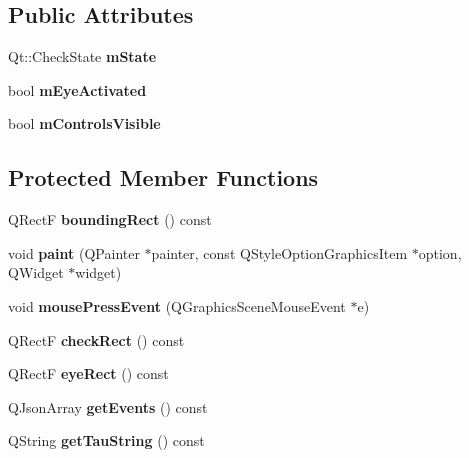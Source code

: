 \subsection*{Public Attributes}
\begin{DoxyCompactItemize}
\item 
\hypertarget{class_phase_item_aa2effba18be1471083090d427da22d91}{Qt\-::\-Check\-State {\bfseries m\-State}}\label{class_phase_item_aa2effba18be1471083090d427da22d91}

\item 
\hypertarget{class_phase_item_adb1a1b264fc34d4a6c4dd3b1ed515132}{bool {\bfseries m\-Eye\-Activated}}\label{class_phase_item_adb1a1b264fc34d4a6c4dd3b1ed515132}

\item 
\hypertarget{class_phase_item_a510033145589f21d329b06dfcb3239d1}{bool {\bfseries m\-Controls\-Visible}}\label{class_phase_item_a510033145589f21d329b06dfcb3239d1}

\end{DoxyCompactItemize}
\subsection*{Protected Member Functions}
\begin{DoxyCompactItemize}
\item 
\hypertarget{class_phase_item_a6be04060907ace485b996a20e0458852}{Q\-Rect\-F {\bfseries bounding\-Rect} () const }\label{class_phase_item_a6be04060907ace485b996a20e0458852}

\item 
\hypertarget{class_phase_item_aa6dd3c7b718102d6e7c5d00ca1f2c5d5}{void {\bfseries paint} (Q\-Painter $\ast$painter, const Q\-Style\-Option\-Graphics\-Item $\ast$option, Q\-Widget $\ast$widget)}\label{class_phase_item_aa6dd3c7b718102d6e7c5d00ca1f2c5d5}

\item 
\hypertarget{class_phase_item_a365277cb2b6a40f8b7928072f4418f83}{void {\bfseries mouse\-Press\-Event} (Q\-Graphics\-Scene\-Mouse\-Event $\ast$e)}\label{class_phase_item_a365277cb2b6a40f8b7928072f4418f83}

\item 
\hypertarget{class_phase_item_a31c4321ce236e2f5c6e9622c368e03be}{Q\-Rect\-F {\bfseries check\-Rect} () const }\label{class_phase_item_a31c4321ce236e2f5c6e9622c368e03be}

\item 
\hypertarget{class_phase_item_a7fd7e64f2ede28dad4130e0c7e5c0acd}{Q\-Rect\-F {\bfseries eye\-Rect} () const }\label{class_phase_item_a7fd7e64f2ede28dad4130e0c7e5c0acd}

\item 
\hypertarget{class_phase_item_af8ff8ef35e6a449c1c17a303a80ba0d1}{Q\-Json\-Array {\bfseries get\-Events} () const }\label{class_phase_item_af8ff8ef35e6a449c1c17a303a80ba0d1}

\item 
\hypertarget{class_phase_item_af5dcdd77bd9d0dbebb76c5098c0b4eb7}{Q\-String {\bfseries get\-Tau\-String} () const }\label{class_phase_item_af5dcdd77bd9d0dbebb76c5098c0b4eb7}

\end{DoxyCompactItemize}


